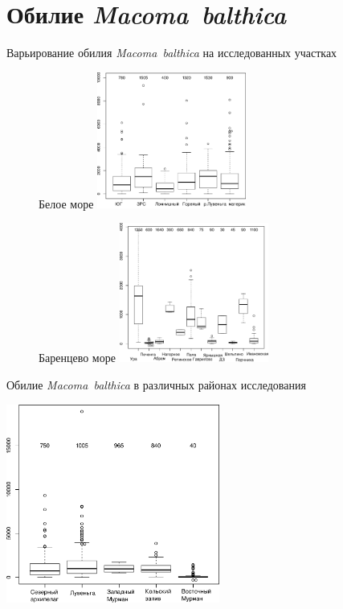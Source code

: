 \documentclass{beamer}
\begin{document}
	\section{Обилие {\it Macoma~balthica}}
\begin{frame}{Варьирование обилия {\it Macoma~balthica} на исследованных участках}
\begin{figure}
\begin{minipage}[b]{.49\linewidth}
	\begin{center}
Белое море
\includegraphics[width=49mm]{./N_all/N2_area_White1.pdf}
\end{center}
	\end{minipage}
	\hfil %
	\begin{minipage}[b]{.49\linewidth}
\begin{center}
Баренцево море
\includegraphics[width=49mm]{./N_all/N2_area_Barents1.pdf}
	\end{center}
	\end{minipage}
\end{figure}
\end{frame}


\begin{frame}{Обилие {\it Macoma~balthica} в различных районах исследования}
\begin{center}
\includegraphics[width=70mm]{./N_all/N2_region1.pdf}
\end{center}
\end{frame}
\end{document}
